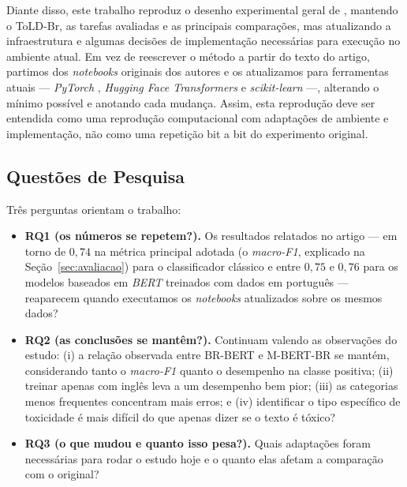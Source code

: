 \documentclass[sigconf, nonacm]{acmart}
\begin{document}
Diante disso, este trabalho reproduz o desenho experimental geral
de \citet{leite2020toxic}, mantendo o ToLD-Br, as tarefas avaliadas e as
principais comparações, mas atualizando a infraestrutura e algumas decisões
de implementação necessárias para execução no ambiente atual. Em vez de
reescrever o método a partir do texto do artigo, partimos dos
\emph{notebooks} originais dos autores \cite{leite2020toldbrgithub} e os atualizamos para ferramentas
atuais --- \emph{PyTorch} \cite{paszke2019pytorch}, \emph{Hugging Face
Transformers} \cite{wolf2020transformers} e \emph{scikit-learn}
\cite{pedregosa2011scikit} ---, alterando o mínimo possível e anotando cada
mudança. Assim, esta reprodução deve ser entendida como uma reprodução
computacional com adaptações de ambiente e implementação, não como uma
repetição bit a bit do experimento original.
 
\subsection{Questões de Pesquisa}
\label{sec:rqs}
 
Três perguntas orientam o trabalho:
 
\begin{itemize}
  \item \textbf{RQ1 (os números se repetem?).} Os resultados relatados no
        artigo --- em torno de $0{,}74$ na métrica principal adotada (o
        \emph{macro-F1}, explicado na Seção~\ref{sec:avaliacao}) para o
        classificador clássico e entre $0{,}75$ e $0{,}76$ para os modelos
        baseados em \emph{BERT} treinados com dados em português ---
        reaparecem quando executamos os \emph{notebooks} atualizados sobre
        os mesmos dados?
  \item \textbf{RQ2 (as conclusões se mantêm?).} Continuam valendo as
        observações do estudo: (i) a relação observada entre BR-BERT e
        M-BERT-BR se mantém, considerando tanto o \emph{macro-F1} quanto o
        desempenho na classe positiva; (ii) treinar apenas com inglês leva
        a um desempenho bem pior; (iii) as categorias menos frequentes
        concentram mais erros; e (iv) identificar o tipo específico de
        toxicidade é mais difícil do que apenas dizer se o texto é tóxico?
  \item \textbf{RQ3 (o que mudou e quanto isso pesa?).} Quais adaptações
        foram necessárias para rodar o estudo hoje e o quanto elas afetam a
        comparação com o original?
\end{itemize}
 
\end{document}
